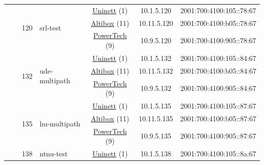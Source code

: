 \begin{small}
\begin{center}
\begin{longtable}{|c|c|c|c|c|c|c|c|}
  &  & \multirow{3}{*}{\tiny{120}} & \multicolumn{1}{|l|}{\multirow{3}{*}{\tiny{srl-test}}} & \multicolumn{2}{|c|}{\tiny{\href{https://www.uninett.no}{Uninett} (1)}} & \tiny{10.1.5.120} & \tiny{2001:700:4100:105::78:67} \\* \cline{5-5}\cline{6-6}\cline{7-7}\cline{8-8}
  &  &  &  & \multicolumn{2}{|c|}{\tiny{\href{https://www.altibox.no}{Altibox} (11)}} & \tiny{10.11.5.120} & \tiny{2001:700:4100:b05::78:67} \\* \cline{5-5}\cline{6-6}\cline{7-7}\cline{8-8}
  &  &  &  & \multicolumn{2}{|c|}{\tiny{\href{http://www.powertech.no}{PowerTech} (9)}} & \tiny{10.9.5.120} & \tiny{2001:700:4100:905::78:67} \\* \cline{3-3}\cline{4-4}\cline{5-5}\cline{6-6}\cline{7-7}\cline{8-8}
  &  & \multirow{3}{*}{\tiny{132}} & \multicolumn{1}{|l|}{\multirow{3}{*}{\tiny{ude-multipath}}} & \multicolumn{2}{|c|}{\tiny{\href{https://www.uninett.no}{Uninett} (1)}} & \tiny{10.1.5.132} & \tiny{2001:700:4100:105::84:67} \\* \cline{5-5}\cline{6-6}\cline{7-7}\cline{8-8}
  &  &  &  & \multicolumn{2}{|c|}{\tiny{\href{https://www.altibox.no}{Altibox} (11)}} & \tiny{10.11.5.132} & \tiny{2001:700:4100:b05::84:67} \\* \cline{5-5}\cline{6-6}\cline{7-7}\cline{8-8}
  &  &  &  & \multicolumn{2}{|c|}{\tiny{\href{http://www.powertech.no}{PowerTech} (9)}} & \tiny{10.9.5.132} & \tiny{2001:700:4100:905::84:67} \\* \cline{3-3}\cline{4-4}\cline{5-5}\cline{6-6}\cline{7-7}\cline{8-8}
  &  & \multirow{3}{*}{\tiny{135}} & \multicolumn{1}{|l|}{\multirow{3}{*}{\tiny{hu-multipath}}} & \multicolumn{2}{|c|}{\tiny{\href{https://www.uninett.no}{Uninett} (1)}} & \tiny{10.1.5.135} & \tiny{2001:700:4100:105::87:67} \\* \cline{5-5}\cline{6-6}\cline{7-7}\cline{8-8}
  &  &  &  & \multicolumn{2}{|c|}{\tiny{\href{https://www.altibox.no}{Altibox} (11)}} & \tiny{10.11.5.135} & \tiny{2001:700:4100:b05::87:67} \\* \cline{5-5}\cline{6-6}\cline{7-7}\cline{8-8}
  &  &  &  & \multicolumn{2}{|c|}{\tiny{\href{http://www.powertech.no}{PowerTech} (9)}} & \tiny{10.9.5.135} & \tiny{2001:700:4100:905::87:67} \\* \cline{3-3}\cline{4-4}\cline{5-5}\cline{6-6}\cline{7-7}\cline{8-8}
  &  & \multirow{3}{*}{\tiny{138}} & \multicolumn{1}{|l|}{\multirow{3}{*}{\tiny{ntnu-test}}} & \multicolumn{2}{|c|}{\tiny{\href{https://www.uninett.no}{Uninett} (1)}} & \tiny{10.1.5.138} & \tiny{2001:700:4100:105::8a:67} \\* \cline{5-5}\cline{6-6}\cline{7-7}\cline{8-8}

\end{longtable}
\end{center}
\end{small}
